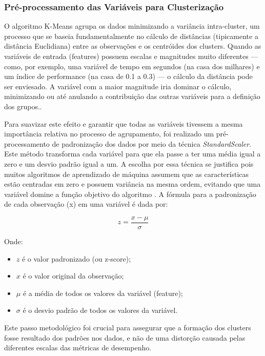 \subsubsection{Pré-processamento das Variáveis para Clusterização}

O algoritmo K-Means agrupa os dados minimizando a variância intra-cluster, um processo que se baseia fundamentalmente no cálculo de distâncias (tipicamente a distância Euclidiana) entre as observações e os centróides dos clusters. Quando as variáveis de entrada (features) possuem escalas e magnitudes muito diferentes — como, por exemplo, uma variável de tempo em segundos (na casa dos milhares) e um índice de performance (na casa de 0.1 a 0.3) — o cálculo da distância pode ser enviesado. A variável com a maior magnitude iria dominar o cálculo, minimizando ou até anulando a contribuição das outras variáveis para a definição dos grupos.\citep{muller2016}.

Para suavizar este efeito e garantir que todas as variáveis tivessem a mesma importância relativa no processo de agrupamento, foi realizado um pré-processamento de padronização dos dados por meio da técnica \textit{StandardScaler}. Este método transforma cada variável para que ela passe a ter uma média igual a zero e um desvio padrão igual a um. A escolha por essa técnica se justifica pois muitos algoritmos de aprendizado de máquina assumem que as características estão centradas em zero e possuem variância na mesma ordem, evitando que uma variável domine a função objetivo do algoritmo \citep{scikitlearn_preprocessing}. A fórmula para a padronização de cada observação (x) em uma variável é dada por:

\begin{equation}
    z = \frac{x - \mu}{\sigma}
    \label{eq:standardscaler}
\end{equation}

Onde:
\begin{itemize}
    \item $z$ é o valor padronizado (ou z-score);
    \item $x$ é o valor original da observação;
    \item $\mu$ é a média de todos os valores da variável (feature);
    \item $\sigma$ é o desvio padrão de todos os valores da variável.
\end{itemize}

Este passo metodológico foi crucial para assegurar que a formação dos clusters fosse resultado dos padrões nos dados, e não de uma distorção causada pelas diferentes escalas das métricas de desempenho.

